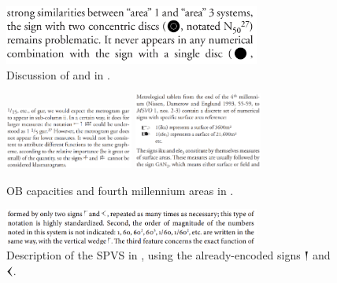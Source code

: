 \documentclass[10pt, a4paper, twoside]{article}
\newcommand\oneŊešTwoC{{\proposalfont\symbol{"1256B}}}
\newcommand\oneŊešʾuC{{\proposalfont\symbol{"12574}}}
\newcommand\oneŠarTwoC{{\proposalfont\symbol{"12579}}}
\newcommand\oneŠarʾuC{{\proposalfont\symbol{"12582}}}
\begin{document}
\begin{figure}[H]
  \begin{center}
  \includegraphics[width=0.75\textwidth]{chambon-6.png}
  \caption[]{Discussion of \oneŠarʾuC{} and \oneŠarTwoC{}\footnotemark{} in \cite[6]{Chambon2003}.\label{chambon6}}
  \end{center}
\end{figure}
\begin{figure}[H]
  \begin{center}
  \includegraphics[width=0.375\textwidth]{proust-9a.png}
  \includegraphics[width=0.375\textwidth]{proust-9.png}
  \caption[]{OB capacities\footnotemark{} and fourth millennium areas in \cite[9]{Proust2009}.\label{proust9}}
  \end{center}
\end{figure}
\begin{figure}[H]
  \begin{center}
  \includegraphics[width=0.75\textwidth]{chambon-58.png}
  \caption{
    Description of the SPVS in \cite[58]{Chambon2012},
    using the already-encoded signs {\xsuxfont 𒁹} and {\xsuxfont 𒌋}.\label{chambon58}}
  \end{center}
\end{figure}
\end{document}
